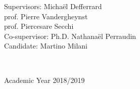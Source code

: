 \begin{titlepage}
\begin{minipage}{1\textwidth}
	\begin{flushleft} \large
		Supervisors: \hspace{0.3cm} Micha\"el Defferrard\\
		\hspace{3.2cm} prof. Pierre Vandergheynst\\
		\hspace{3.2cm} prof. Piercesare Secchi\\
		Co-supervisor:  Ph.D. Nathana\"el Perraudin\\
		\vspace{0.5cm}
		Candidate: \hspace{0.55cm} Martino Milani
		\end{flushleft}
	\vspace{2cm}
\end{minipage}
~

{\large Academic Year 2018/2019 } %
\vspace{0cm}
\end{titlepage}
